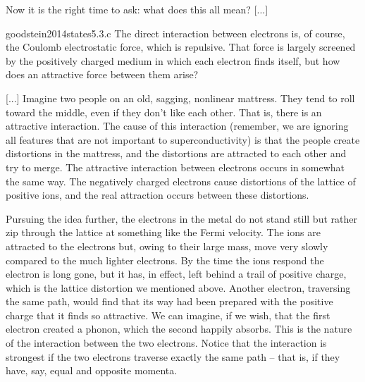 Now it is the right time to ask: what does this all mean? [...]

\begin{cit}{goodstein2014states}{5.3.c}
	The direct interaction between electrons is, of course, the Coulomb electrostatic force, which is repulsive. That force is largely screened by the positively charged medium in which each electron finds itself, but how does an attractive force between them arise? 
	
	[...] Imagine two people on an old, sagging, nonlinear mattress. They tend to roll toward the middle, even if they don't like each other. That is, there is an attractive interaction. The cause of this interaction (remember, we are ignoring all features that are not important to superconductivity) is that the people create distortions in the mattress, and the distortions are attracted to each other and try to merge. The attractive interaction between electrons occurs in somewhat the same way. The negatively charged electrons cause distortions of the lattice of positive ions, and the real attraction occurs between these distortions.
	
	Pursuing the idea further, the electrons in the metal do not stand still but rather zip through the lattice at something like the Fermi velocity. The ions are attracted to the electrons but, owing to their large mass, move very slowly compared to the much lighter electrons. By the time the ions respond the electron is long gone, but it has, in effect, left behind a trail of positive charge, which is the lattice distortion we mentioned above. Another electron, traversing the same path, would find that its way had been prepared with the positive charge that it finds so attractive. We can imagine, if we wish, that the first electron created a phonon, which the second happily absorbs. This is the nature of the interaction between the two electrons. Notice that the interaction is strongest if the two electrons traverse exactly the same path -- that is, if they have, say, equal and opposite momenta.
\end{cit}
